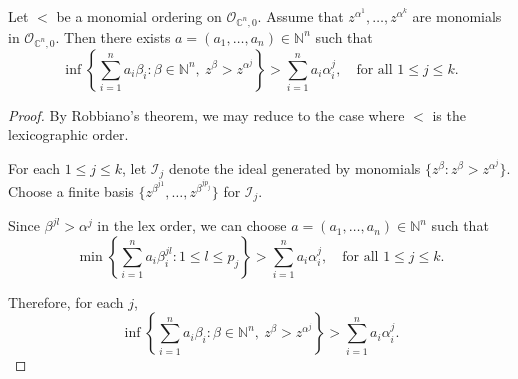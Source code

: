 \documentclass[10pt,a4paper]{amsart}
\begin{document}
\begin{proposition}\label{flat_family}
	Let $<$ be a monomial ordering on $\mathcal{O}_{\mathbb{C}^n, 0}$. Assume that $z^{\alpha^1}, \dots, z^{\alpha^k}$ are monomials in $\mathcal{O}_{\mathbb{C}^n, 0}$. Then there exists $a = (a_1, \dots, a_n) \in \mathbb{N}^n$ such that
	$$
	\inf\left\{ \sum_{i=1}^n a_i \beta_i : \beta \in \mathbb{N}^n,\ z^{\beta} > z^{\alpha^j} \right\}
	> \sum_{i=1}^n a_i \alpha_i^j,\quad \text{for all } 1 \leq j \leq k.
	$$
\end{proposition}

\begin{proof}
	By Robbiano's theorem, we may reduce to the case where $<$ is the lexicographic order.
	
	For each $1 \leq j \leq k$, let $\mathcal{I}_j$ denote the ideal generated by monomials $\{ z^\beta : z^\beta > z^{\alpha^j} \}$. Choose a finite basis $\{ z^{\beta^{j1}}, \dots, z^{\beta^{jp_j}} \}$ for $\mathcal{I}_j$.
	
	Since $\beta^{jl} > \alpha^j$ in the lex order, we can choose $a = (a_1, \dots, a_n) \in \mathbb{N}^n$ such that
	$$
	\min \left\{ \sum_{i=1}^n a_i \beta_i^{jl} : 1 \leq l \leq p_j \right\}
	> \sum_{i=1}^n a_i \alpha_i^j,
	\quad \text{for all } 1 \leq j \leq k.
	$$
	
	Therefore, for each $j$,
	$$
	\inf\left\{ \sum_{i=1}^n a_i \beta_i : \beta \in \mathbb{N}^n,\ z^\beta > z^{\alpha^j} \right\}
	> \sum_{i=1}^n a_i \alpha_i^j.
	$$
\end{proof}
\end{document}
